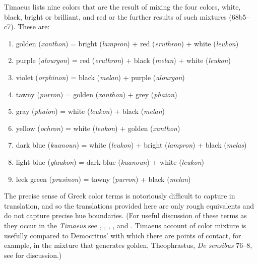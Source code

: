 Timaeus lists nine colors that are the result of mixing the four colors, white, black, bright or brilliant, and red or the further results of such mixtures (68b5--c7). These are:
\begin{enumerate}[(1)]
	\item golden (\emph{xanthon}) = bright (\emph{lampron}) + red (\emph{eruthron}) + white (\emph{leukon})
	\item purple (\emph{alourgon}) = red (\emph{eruthron}) + black (\emph{melan}) + white (\emph{leukon})
	\item violet (\emph{orphinon}) = black (\emph{melan}) + purple (\emph{alourgon})
	\item tawny (\emph{purron}) = golden (\emph{xanthon}) + grey (\emph{phaion})
	\item gray (\emph{phaion}) = white (\emph{leukon}) + black (\emph{melan})
	\item yellow (\emph{ochron}) = white (\emph{leukon}) + golden (\emph{xanthon})
	\item dark blue (\emph{kuanoun}) = white (\emph{leukon}) + bright (\emph{lampron}) + black (\emph{melas})
	\item light blue (\emph{glaukon}) = dark blue (\emph{kuanoun}) + white (\emph{leukon})
	\item leek green (\emph{prasinon}) = tawny (\emph{purron}) + black (\emph{melan})
\end{enumerate}
The precise sense of Greek color terms is notoriously difficult to capture in translation, and so the translations provided here are only rough equivalents and do not capture precise hue boundaries. (For useful discussion of these terms as they occur in the \emph{Timaeus} see \citet{Platnauer:1921bh}, \citet[483--5]{Taylor:1928qb}, \citet[chapter 10]{Bruno:1977fk}, \citet{Levides:2002aa}, and \citet{Struycken:2003zr}. Timaeus account of color mixture is usefully compared to Democritus' with which there are points of contact, for example, in the mixture that generates golden, Theophrastus, \emph{De sensibus} 76--8, see \citealt{Struycken:2003zr} for discussion.)

